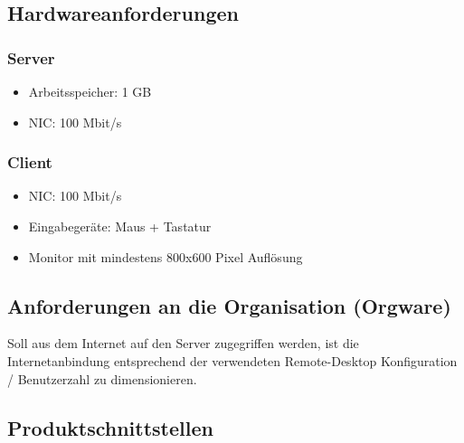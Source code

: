 \documentclass[a4paper,10pt]{article}
\begin{document}
\subsection{Hardwareanforderungen}
\subsubsection{Server}
\begin{itemize}
	\item Arbeitsspeicher: 1 GB
	\item NIC: 100 Mbit/s
\end{itemize}
\subsubsection{Client}
\begin{itemize}
	\item NIC: 100 Mbit/s
	\item Eingabegeräte: Maus + Tastatur
	\item Monitor mit mindestens 800x600 Pixel Auflösung
\end{itemize}
\subsection{Anforderungen an die Organisation (Orgware)}
Soll aus dem Internet auf den Server zugegriffen werden, ist die Internetanbindung entsprechend der verwendeten Remote-Desktop Konfiguration / Benutzerzahl zu dimensionieren.
\subsection{Produktschnittstellen}
\end{document}
